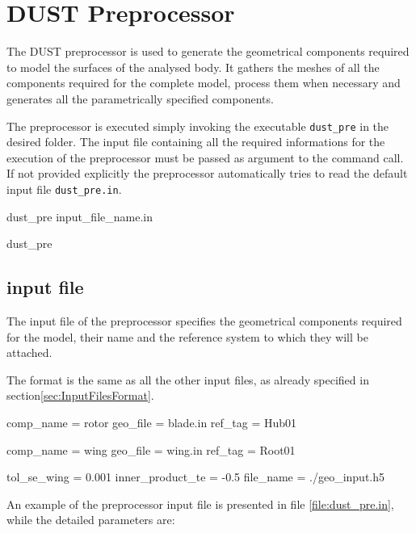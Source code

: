 \chapter{DUST Preprocessor}
\label{ch:Pre}

The DUST preprocessor is used to generate the geometrical components required to model 
the surfaces of the analysed body. It gathers the meshes of all the components required 
for the complete model, process them when necessary and generates all the parametrically 
specified components. 

The preprocessor is executed simply invoking the executable \texttt{dust\_pre} in the desired folder. 
The input file containing all the required informations for the execution of the preprocessor must be 
passed as argument to the command call. If not provided explicitly the preprocessor automatically 
tries to read the default input file \texttt{dust\_pre.in}.
\begin{command}[caption={Preprocessor command looking for input file \texttt{input\_file\_name.in}}]
  dust_pre input_file_name.in
\end{command}

\begin{command}[caption={Preprocessor command looking for 
default input file \texttt{dust\_pre.in}}, label={command:dus_pre_default}]
  dust_pre
\end{command}


\section{input file}
\label{sec:Pre_InputFile}

The input file of the preprocessor specifies the geometrical components required 
for the model, their name and the reference system to which they will be attached.

The format is the same as all the other input files, as already specified in 
section\ref{sec:InputFilesFormat}.

\begin{inputfile}[frame=single, caption={dust_pre.in}, label={file:dust_pre.in}]
comp_name = rotor
geo_file  = blade.in
ref_tag   = Hub01

comp_name = wing
geo_file  = wing.in
ref_tag   = Root01

tol_se_wing  = 0.001
inner_product_te = -0.5
file_name = ./geo_input.h5 
\end{inputfile}

An example of the preprocessor input file is presented in file 
\ref{file:dust_pre.in}, while the detailed parameters are:

